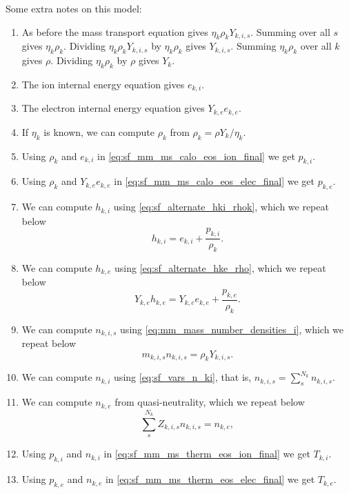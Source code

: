 \documentclass[a4paper,11pt]{report}
\begin{document}
Some extra notes on this model:
\begin{enumerate}
    \item As before the mass transport equation gives $\eta_k \rho_k Y_{k,i,s}$. Summing over all $s$ gives $\eta_k \rho_k$. Dividing $\eta_k \rho_k Y_{k,i,s}$ by $\eta_k \rho_k$ gives $Y_{k,i,s}$. Summing $\eta_k \rho_k$ over all $k$ gives $\rho$. Dividing $\eta_k \rho_k$ by $\rho$ gives $Y_k$.

    \item The ion internal energy equation gives $e_{k,i}$. 

    \item The electron internal energy equation gives $Y_{k,e} e_{k,e}$.

    \item If $\eta_k$ is known, we can compute $\rho_k$ from $\rho_k = \rho Y_k / \eta_k$.

    \item Using $\rho_k$ and $e_{k,i}$ in \cref{eq:sf_mm_ms_calo_eos_ion_final} we get $p_{k,i}$.

    \item Using $\rho_k$ and $Y_{k,e} e_{k,e}$ in \cref{eq:sf_mm_ms_calo_eos_elec_final} we get $p_{k,e}$.

    \item We can compute $h_{k,i}$ using \cref{eq:sf_alternate_hki_rhok}, which we repeat below
    \begin{equation*}
        h_{k,i} = e_{k,i} + \frac{p_{k,i}}{\rho_k}.
    \end{equation*}

    \item We can compute $h_{k,e}$ using \cref{eq:sf_alternate_hke_rho}, which we repeat below
    \begin{equation*}
        Y_{k,e} h_{k,e} = Y_{k,e} e_{k,e} + \frac{p_{k,e}}{\rho_k}.
    \end{equation*}

    \item We can compute $n_{k,i,s}$ using \cref{eq:mm_mass_number_densities_i}, which we repeat below
    \begin{equation*}
        m_{k,i,s} n_{k,i,s} = \rho_k Y_{k,i,s}.
    \end{equation*}

    \item We can compute $n_{k,i}$ using \cref{eq:sf_vars_n_ki}, that is, $n_{k,i,s} = \sum_s^{N_k} n_{k,i,s}$.
    
    \item We can compute $n_{k,e}$ from quasi-neutrality, which we repeat below
    \begin{equation}
        \sum_s^{N_k} Z_{k,i,s} n_{k,i,s} = n_{k,e},
    \end{equation}

    \item Using $p_{k,i}$ and $n_{k,i}$ in \cref{eq:sf_mm_ms_therm_eos_ion_final} we get $T_{k,i}$.

    \item Using $p_{k,e}$ and $n_{k,e}$ in \cref{eq:sf_mm_ms_therm_eos_elec_final} we get $T_{k,e}$.
\end{enumerate}
\end{document}
